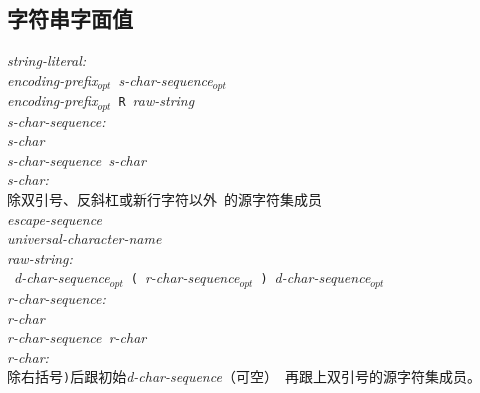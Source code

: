 \subsection{字符串字面值}
\noindent \mbox{\qquad \textit{string-literal:}}                              \\
\mbox{\qquad \qquad \textit{encoding-prefix$_{opt}$}
\texttt{\qdbl}\textit{s-char-sequence$_{opt}$}\texttt{\qdbl}}                 \\
\mbox{\qquad \qquad \textit{encoding-prefix$_{opt}$} \texttt{R}
  \textit{raw-string}}                                                        \\
\noindent \mbox{\qquad \textit{s-char-sequence:}}                             \\
\mbox{\qquad \qquad \textit{s-char}}                                          \\
\mbox{\qquad \qquad \textit{s-char-sequence s-char}}                          \\
\noindent \mbox{\qquad \textit{s-char:}}                                      \\
\mbox{\qquad \qquad 除双引号\texttt{\qdbl}、反斜杠\texttt{\bslh}或新行字符以外
  的源字符集成员}                                                             \\
\mbox{\qquad \qquad \textit{escape-sequence}}                                 \\
\mbox{\qquad \qquad \textit{universal-character-name}}                        \\
\noindent \mbox{\qquad \textit{raw-string:}}                                  \\
\mbox{\qquad \qquad \texttt{\qdbl} \textit{d-char-sequence$_{opt}$}
  \texttt{(} \textit{r-char-sequence$_{opt}$} \texttt{)}
  \textit{d-char-sequence$_{opt}$} \texttt{\qdbl}}                            \\
\noindent \mbox{\qquad \textit{r-char-sequence:}}                             \\
\mbox{\qquad \qquad \textit{r-char}}                                          \\
\mbox{\qquad \qquad \textit{r-char-sequence r-char}}                          \\
\noindent \mbox{\qquad \textit{r-char:}}                                      \\
\mbox{\qquad \qquad 除右括号\texttt{)}后跟初始\textit{d-char-sequence}（可空）
  再跟上双引号\texttt{\qdbl}的源字符集成员。}                                 \\
